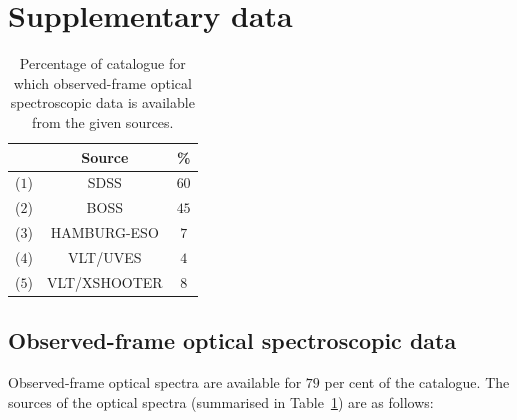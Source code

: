 \section{Supplementary data}

\begin{table}
  \centering
  \footnotesize 
    \begin{tabular}{ccc}
    \hline
    & Source & \% \\
    \hline
    ($1$) & SDSS & $60$ \\
    ($2$) & BOSS & $45$ \\
    ($3$) & HAMBURG-ESO & $7$ \\
    ($4$) & VLT/UVES & $4$ \\
    ($5$) & VLT/XSHOOTER & $8$ \\ 
    \hline
    \end{tabular}
    \caption[{Percentage of catalogue for which observed-frame optical spectroscopic data is available from the given sources.}]{Percentage of catalogue for which observed-frame optical spectroscopic data is available from the given sources.}
  \label{tab:optical-data}
\end{table} 

\subsection{Observed-frame optical spectroscopic data}

Observed-frame optical spectra are available for $79$ per cent of the catalogue.  
The sources of the optical spectra (summarised in Table~\ref{tab:optical-data}) are as follows:

